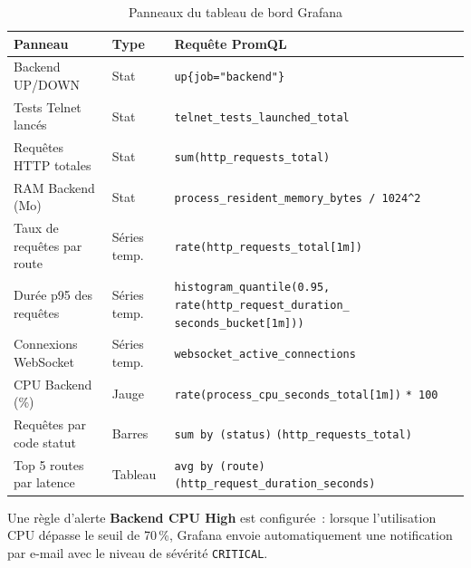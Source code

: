\begin{table}[H]
  \centering
  \caption{Panneaux du tableau de bord Grafana}
  \label{tab:grafana_panels}
  \begin{tabularx}{\textwidth}{|L{4.5cm}|L{2.5cm}|X|}
    \hline
    \textbf{Panneau} & \textbf{Type} & \textbf{Requête PromQL} \\
    \hline
    Backend UP/DOWN & Stat &
      \texttt{up\{job="backend"\}} \\
    \hline
    Tests Telnet lancés & Stat &
      \texttt{telnet\_tests\_launched\_total} \\
    \hline
    Requêtes HTTP totales & Stat &
      \texttt{sum(http\_requests\_total)} \\
    \hline
    RAM Backend (Mo) & Stat &
      {\small\texttt{process\_resident\_memory\_bytes / 1024\^{}2}} \\
    \hline
    Taux de requêtes par route & Séries temp. &
      \texttt{rate(http\_requests\_total[1m])} \\
    \hline
    Durée p95 des requêtes & Séries temp. &
      {\small\texttt{histogram\_quantile(0.95,}}\newline
      {\small\texttt{rate(http\_request\_duration\_}}\newline
      {\small\texttt{seconds\_bucket[1m]))}} \\
    \hline
    Connexions WebSocket & Séries temp. &
      \texttt{websocket\_active\_connections} \\
    \hline
    CPU Backend (\%) & Jauge &
      {\small\texttt{rate(process\_cpu\_seconds\_total[1m])}}\newline
      {\small\texttt{* 100}} \\
    \hline
    Requêtes par code statut & Barres &
      {\small\texttt{sum by (status)}}\newline
      {\small\texttt{(http\_requests\_total)}} \\
    \hline
    Top 5 routes par latence & Tableau &
      {\small\texttt{avg by (route)}}\newline
      {\small\texttt{(http\_request\_duration\_seconds)}} \\
    \hline
  \end{tabularx}
\end{table}

Une règle d'alerte \textbf{Backend CPU High} est configurée~: lorsque
l'utilisation CPU dépasse le seuil de 70\,\%, Grafana envoie automatiquement
une notification par e-mail avec le niveau de sévérité \texttt{CRITICAL}.

